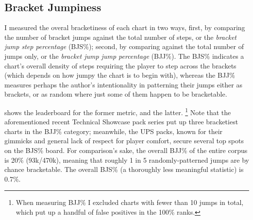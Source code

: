 \documentclass[10pt]{sigplanconf}
\begin{document}
\subsection{Bracket Jumpiness}
\label{sec:bjness}

I measured the overal bracketiness of each chart in two ways,
first,
by comparing the number of bracket jumps against the total number of steps,
or the \textit{bracket jump step percentage} (BJS\%);
second,
by comparing against the total number of jumps only,
or the \textit{bracket jump jump percentage} (BJJ\%).
The BJS\% indicates a chart's overall density of steps requiring the player to step across the brackets
(which depends on how jumpy the chart is to begin with),
whereas the BJJ\% measures perhaps the author's intentionality in patterning their jumps either as brackets,
or as random where just some of them happen to be bracketable.

 shows the leaderboard for the former metric, and  the latter.%
\footnote{When measuring BJJ\% I excluded charts with fewer than 10 jumps in total,
which put up a handful of false positives in the 100\% ranks.}
Note that the aforementioned recent Technical Showcase pack series put up three bracketiest charts in the BJJ\% category;
meanwhile, the UPS packs, known for their gimmicks and general lack of respect for player comfort,
secure several top spots on the BJS\% board.
For comparison's sake, the overall BJJ\% of the entire corpus is 20\% (93k/470k),
meaning that roughly 1 in 5 randomly-patterned jumps are by chance bracketable.
The overall BJS\% (a thoroughly less meaningful statistic) is 0.7\%.
\end{document}
